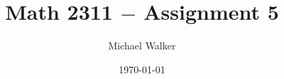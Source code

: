 \documentclass[11pt]{article}
\author{Michael Walker}
\title{Math 2311 $-$ Assignment 5}
\date{\today}
\begin{document}
\maketitle
\pagebreak

\tableofcontents
\pagebreak


\pagebreak


\pagebreak


\pagebreak


\pagebreak


\pagebreak
\end{document}
